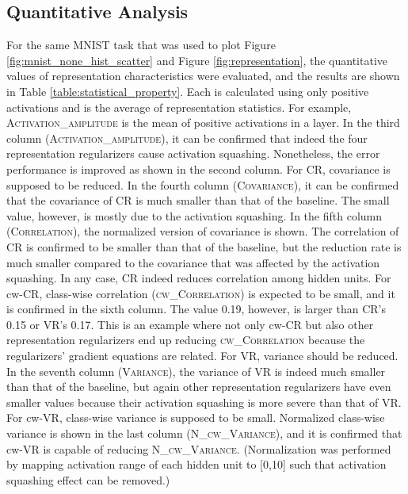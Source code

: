 \documentclass[letterpaper]{article} %
\begin{document}
\subsection{Quantitative Analysis}
For the same MNIST task that was used to plot Figure \ref{fig:mnist_none_hist_scatter} and Figure \ref{fig:representation}, the quantitative values of representation characteristics were evaluated, and the results are shown in Table \ref{table:statistical_property}. Each is calculated using only positive activations and is the average of representation statistics. For example, \textsc{Activation\_amplitude} is the mean of positive activations in a layer.
In the third column (\textsc{Activation\_amplitude}), it can be confirmed that indeed the four representation regularizers cause activation squashing. Nonetheless, the error performance is improved as shown in the second column. For CR, covariance is supposed to be reduced. In the fourth column (\textsc{Covariance}), it can be confirmed that the covariance of CR is much smaller than that of the baseline. The small value, however, is mostly due to the activation squashing. In the fifth column (\textsc{Correlation}), the normalized version of covariance is shown. The correlation of CR is confirmed to be smaller than that of the baseline, but the reduction rate is much smaller compared to the covariance that was affected by the activation squashing. In any case, CR indeed reduces correlation among hidden units. For cw-CR, class-wise correlation (\textsc{cw\_Correlation}) is expected to be small, and it is confirmed in the sixth column. The value 0.19, however, is larger than CR's 0.15 or VR's 0.17. This is an example where not only cw-CR but also other representation regularizers end up reducing \textsc{cw\_Correlation} because the regularizers' gradient equations are related. For VR, variance should be reduced. In the seventh column (\textsc{Variance}), the variance of VR is indeed much smaller than that of the baseline, but again other representation regularizers have even smaller values because their activation squashing is more severe than that of VR. For cw-VR, class-wise variance is supposed to be small. Normalized class-wise variance is shown in the last column (\textsc{N\_cw\_Variance}), and it is confirmed that cw-VR is capable of reducing \textsc{N\_cw\_Variance}. (Normalization was performed by mapping activation range of each hidden unit to [0,10] such that activation squashing effect can be removed.)  


\end{document}
